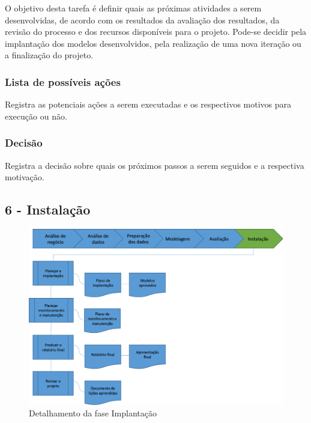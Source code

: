 O objetivo desta tarefa é definir quais as próximas atividades a serem desenvolvidas, de acordo com os resultados da avaliação dos resultados, da revisão do processo e dos recursos disponíveis para o projeto. Pode-se decidir pela implantação dos modelos desenvolvidos, pela realização de uma nova iteração ou a finalização do projeto.

\subsubsection*{Lista de possíveis ações}

Registra as potenciais ações a serem executadas e os respectivos motivos para execução ou não.

\subsubsection*{Decisão}

Registra a decisão sobre quais os próximos passos a serem seguidos e a respectiva motivação.

\newpage 

\subsection*{6 - Instalação}


\begin{figure}[H]
	\includegraphics[scale=0.8]{img/CRISP-DM-Implantacao.png}
	\caption{Detalhamento da fase Implantação}
	\label{img:CRISP-DM-Implantação}
\end{figure}

